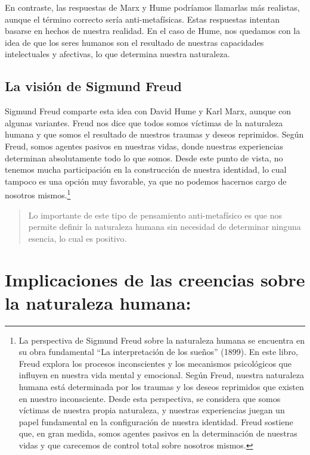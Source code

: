 \documentclass[
  letterpaper,
  DIV=11,
  numbers=noendperiod]{scrartcl}
\begin{document}
En contraste, las respuestas de Marx y Hume podríamos llamarlas más
realistas, aunque el término correcto sería anti-metafísicas. Estas
respuestas intentan basarse en hechos de nuestra realidad. En el caso de
Hume, nos quedamos con la idea de que los seres humanos son el resultado
de nuestras capacidades intelectuales y afectivas, lo que determina
nuestra naturaleza.

\hypertarget{la-visiuxf3n-de-sigmund-freud}{%
\subsection{La visión de Sigmund
Freud}\label{la-visiuxf3n-de-sigmund-freud}}

Sigmund Freud comparte esta idea con David Hume y Karl Marx, aunque con
algunas variantes. Freud nos dice que todos somos víctimas de la
naturaleza humana y que somos el resultado de nuestros traumas y deseos
reprimidos. Según Freud, somos agentes pasivos en nuestras vidas, donde
nuestras experiencias determinan absolutamente todo lo que somos. Desde
este punto de vista, no tenemos mucha participación en la construcción
de nuestra identidad, lo cual tampoco es una opción muy favorable, ya
que no podemos hacernos cargo de nosotros mismos.\footnote{La
  perspectiva de Sigmund Freud sobre la naturaleza humana se encuentra
  en su obra fundamental ``La interpretación de los sueños'' (1899). En
  este libro, Freud explora los procesos inconscientes y los mecanismos
  psicológicos que influyen en nuestra vida mental y emocional. Según
  Freud, nuestra naturaleza humana está determinada por los traumas y
  los deseos reprimidos que existen en nuestro inconsciente. Desde esta
  perspectiva, se considera que somos víctimas de nuestra propia
  naturaleza, y nuestras experiencias juegan un papel fundamental en la
  configuración de nuestra identidad. Freud sostiene que, en gran
  medida, somos agentes pasivos en la determinación de nuestras vidas y
  que carecemos de control total sobre nosotros mismos.}

\begin{quote}
Lo importante de este tipo de pensamiento anti-metafísico es que nos
permite definir la naturaleza humana sin necesidad de determinar ninguna
esencia, lo cual es positivo.
\end{quote}

\hypertarget{implicaciones-de-las-creencias-sobre-la-naturaleza-humana}{%
\section{Implicaciones de las creencias sobre la naturaleza
humana:}\label{implicaciones-de-las-creencias-sobre-la-naturaleza-humana}}
\end{document}
